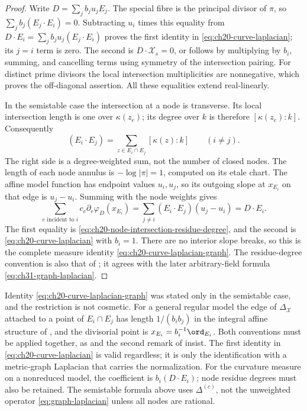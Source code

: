 \begin{proof}
Write \(D=\sum_j b_j u_jE_j\).  The special fibre is the principal
divisor of \(\pi\), so \(\sum_j b_j(E_j\cdot E_i)=0\).
Subtracting \(u_i\) times this equality from
\(D\cdot E_i=\sum_j b_j u_j(E_j\cdot E_i)\) proves the first
identity in \eqref{eq:ch20-curve-laplacian}; its \(j=i\) term is zero.
The second is \(D\cdot\mathcal X_s=0\), or follows by multiplying
by \(b_i\), summing, and cancelling terms using symmetry of the
intersection pairing.  For distinct prime divisors the local
intersection multiplicities are nonnegative, which proves the
off-diagonal assertion.  All these equalities extend real-linearly.

In the semistable case the intersection at a node is transverse.
Its local intersection length is one over \(\kappa(z_e)\); its
degree over \(k\) is therefore \([\kappa(z_e):k]\).  Consequently
\begin{equation}
\label{eq:ch20-node-intersection-residue-degree}
             (E_i\cdot E_j)
        =\sum_{z\in E_i\cap E_j}[\kappa(z):k]
                   \qquad(i\ne j).
\end{equation}
The right side is a degree-weighted sum, not the number of closed nodes.
The length of each node annulus is
\(-\log|\pi|=1\), computed on its etale chart.  The affine model
function has endpoint values \(u_i,u_j\), so its outgoing slope
at \(x_{E_i}\) on that edge is \(u_j-u_i\).  Summing with the
node weights gives
\[
 \sum_{e\text{ incident to }i}c_e\partial_e\varphi_D(x_{E_i})
    =\sum_{j\ne i}(E_i\cdot E_j)(u_j-u_i)
    =D\cdot E_i.
\]
The first equality is \eqref{eq:ch20-node-intersection-residue-degree},
and the second is \eqref{eq:ch20-curve-laplacian} with \(b_i=1\).
There are no interior slope breaks, so this is the complete measure
identity \eqref{eq:ch20-curve-laplacian-graph}.
The residue-degree convention is also that of
\cite[Remark~1.2.4 and \S2.2.3]{Thu05}; it agrees with the later
arbitrary-field formula \eqref{eq:ch31-graph-laplacian}.
\end{proof}


\begin{remark}
\label{rem:ch20-multiplicities-lengths}
Identity \eqref{eq:ch20-curve-laplacian-graph} was stated only in the
semistable case, and the restriction is not cosmetic.  For a general regular
model the edge of \(\Delta_{\mathcal X}\) attached to a point of
\(E_i\cap E_j\) has length \(1/(b_ib_j)\) in the integral affine structure
of , and the divisorial point is
\(x_{E_i}=b_i^{-1}\ord_{E_i}\).  Both conventions must be applied together,
as  and the second remark of
 insist.  The first identity in
\eqref{eq:ch20-curve-laplacian} is valid regardless; it is only the
identification with a metric-graph Laplacian that carries the
normalization.  For the curvature measure on a nonreduced model, the
coefficient is \(b_i(D\cdot E_i)\); node residue degrees must also be
retained.  The semistable formula above uses \(\Delta^{(c)}\), not the
unweighted operator \eqref{eq:graph-laplacian} unless all nodes are rational.
\end{remark}

